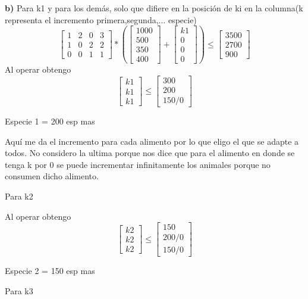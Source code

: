 \documentclass[12pt]{article}
\begin{document}
\textbf{b)} Para k1 y para los demás, solo que difiere en la posición de ki en la columna(k representa el incremento primera,segunda,... especie)
\[
\begin{bmatrix}
1 & 2 & 0 & 3 \\
1 & 0 & 2 & 2 \\
0 &0 & 1& 1 
\end{bmatrix}
*(
\begin{bmatrix}
1000 \\
500\\
350\\
400
\end{bmatrix}
+
\begin{bmatrix}
k1\\
0\\
0\\
0

\end{bmatrix}
)\leq
\begin{bmatrix}
3500\\
2700\\
900
\end{bmatrix}
\] 
Al operar obtengo
\[
\begin{bmatrix}
k1 \\
k1 \\
k1
\end{bmatrix} \leq 
\begin{bmatrix}
300 \\
200\\
150/0
\end{bmatrix}
\] 

Especie 1 = 200 esp mas

Aquí me da el incremento para cada alimento por lo que eligo el que se adapte a todos.
No considero la ultima porque nos dice que para el alimento en donde se tenga k por 0 se puede incrementar infinitamente los animales porque no consumen dicho alimento.

Para k2

Al operar obtengo
\[
\begin{bmatrix}
k2 \\
k2 \\
k2
\end{bmatrix} \leq 
\begin{bmatrix}
150 \\
200/0\\
150/0
\end{bmatrix}
\] 

Especie 2 = 150 esp mas

Para k3
\end{document}
